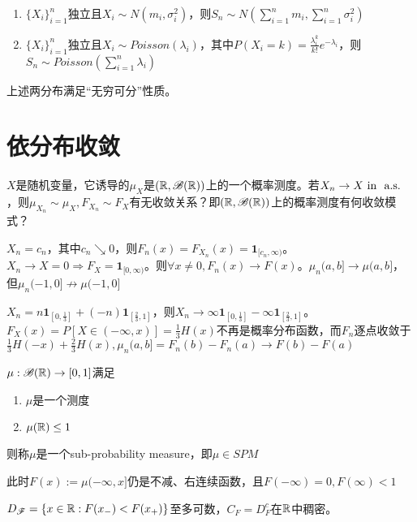 \documentclass{ctexbook}
\begin{document}
\begin{Rmk}
\begin{enumerate}
\item $\{X_{i}\}_{i=1}^{n}$独立且$X_{i}\sim N(m_{i},\sigma_{i}^{2})$，则$S_{n}\sim N(\sum\limits_{i=1}^{n} m_{i},\sum\limits_{i=1}^{n} \sigma_{i}^{2})$
\item $\{X_{i}\}_{i=1}^{n}$独立且$X_{i}\sim Poisson(\lambda_{i})$，其中$P(X_{i}=k)=\frac{\lambda^{k}_{i}}{k!}e^{-\lambda_{i}}$，则$S_{n}\sim Poisson(\sum\limits_{i=1}^{n}\lambda_{i})$
  \end{enumerate}
\end{Rmk}

上述两分布满足“无穷可分”性质。

\section{依分布收敛}
$X$是随机变量，它诱导的$\mu_{X}$是$(\mathbb{R},\mathscr{B}(\mathbb{R}))$上的一个概率测度。若$X_{n}\to X\text{ in } \text{ a.s. }$，则$\mu_{X_{n}}\sim \mu_{X},F_{X_{n}}\sim F_{X}$有无收敛关系？即$(\mathbb{R},\mathscr{B}(\mathbb{R}))$上的概率测度有何收敛模式？

\begin{Eg}
  $X_{n}=c_{n}$，其中$c_{n}\searrow 0$，则$F_{n}(x)=F_{X_{n}}(x)=\bm{1}_{[c_{n},\infty)}$。$X_{n}\to X=0\Rightarrow F_{X}=\bm{1}_{[0,\infty)}$。则$\forall x\neq 0, F_{n}(x)\to F(x)$。$\mu_{n}(a,b]\to \mu(a,b]$，但$\mu_{n}(-1,0]\not\to \mu(-1,0]$
\end{Eg}

\begin{Eg}
  $X_{n}=n\bm{1}_{[0,\frac{1}{3}]}+(-n)\bm{1}_{[\frac{2}{3},1]}$，则$X_{n}\to \infty \bm{1}_{[0,\frac 1 3]}-\infty\bm{1}_{[\frac{2}{3},1]}$。$F_{X}(x)=P[X\in (-\infty,x)]=\frac{1}{3}H(x)$不再是概率分布函数，而$F_{n}$逐点收敛于$\frac{1}{3}H(-x)+\frac{2}{3}H(x),\mu_{n}(a,b]=F_{n}(b)-F_{n}(a)\to F(b)-F(a)$
\end{Eg}

\begin{Def}[次概率分布]
  $\mu:\mathscr{B}(\mathbb{R})\to [0,1]$满足
  \begin{enumerate}
  \item $\mu$是一个测度
  \item $\mu(\mathbb{R})\leq 1$
  \end{enumerate}
  则称$\mu$是一个sub-probability measure，即$\mu\in SPM$

  此时$F(x):=\mu(-\infty,x]$仍是不减、右连续函数，且$F(-\infty)=0,F(\infty)<1$
\end{Def}
\begin{Rmk}
  $D_{\mathscr{F}}=\{x\in\mathbb{R}: F(x_{-})<F(x_{+})\}$至多可数，$C_{F}=D_{F}^{c}$在$\mathbb{R}$中稠密。
\end{Rmk}
\end{document}
